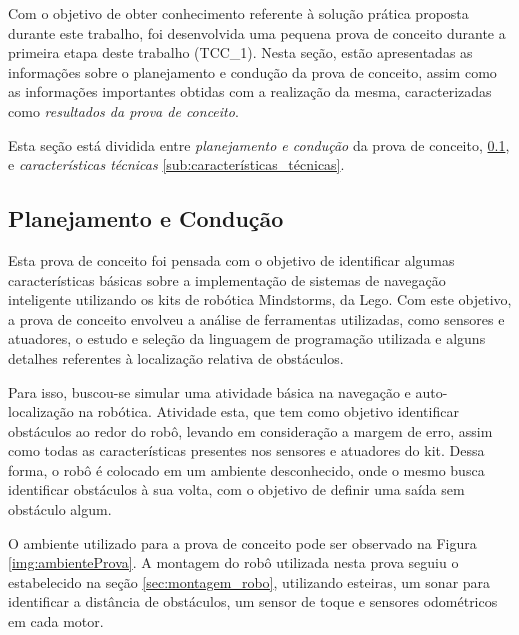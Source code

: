 
	Com o objetivo de obter conhecimento referente à solução prática proposta durante este trabalho, foi desenvolvida uma pequena prova de conceito durante a primeira etapa deste trabalho (TCC\_1). Nesta seção, estão apresentadas as informações sobre o planejamento e condução da prova de conceito, assim como as informações importantes obtidas com a realização da mesma, caracterizadas como \textit{resultados da prova de conceito}.

	Esta seção está dividida entre \textit{planejamento e condução} da prova de conceito, \ref{sub:planejamento_e_condução}, e \textit{características técnicas} \ref{sub:características_técnicas}.

	\subsection{Planejamento e Condução} %
	\label{sub:planejamento_e_condução}

		Esta prova de conceito foi pensada com o objetivo de identificar algumas características básicas sobre a implementação de sistemas
		de navegação inteligente utilizando os kits de robótica Mindstorms, da Lego. Com este objetivo, a prova de conceito envolveu a
		análise de ferramentas utilizadas, como sensores e atuadores, o estudo e seleção da linguagem de programação utilizada e alguns
		detalhes referentes à localização relativa de obstáculos.

		Para isso, buscou-se simular uma atividade básica na navegação e auto-localização na robótica. Atividade esta, que tem como objetivo identificar obstáculos ao redor do robô, levando em consideração a margem de erro, assim como todas as características presentes nos sensores e atuadores do kit. Dessa forma, o robô é colocado em um ambiente desconhecido, onde o mesmo busca identificar obstáculos à sua volta, com o objetivo de definir uma saída sem obstáculo algum.

		O ambiente utilizado para a prova de conceito pode ser observado na Figura \ref{img:ambienteProva}. A montagem do robô utilizada nesta prova seguiu o estabelecido na seção \ref{sec:montagem_robo}, utilizando esteiras, um sonar para identificar a distância de obstáculos, um sensor de toque e sensores odométricos em cada motor.

